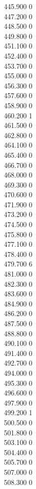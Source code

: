 { 445.900	0 \\
 447.200	0 \\
 448.500	0 \\
 449.800	0 \\
 451.100	0 \\
 452.400	0 \\
 453.700	0 \\
 455.000	0 \\
 456.300	0 \\
 457.600	0 \\
 458.900	0 \\
 460.200	1 \\
 461.500	0 \\
 462.800	0 \\
 464.100	0 \\
 465.400	0 \\
 466.700	0 \\
 468.000	0 \\
 469.300	0 \\
 470.600	0 \\
 471.900	0 \\
 473.200	0 \\
 474.500	0 \\
 475.800	0 \\
 477.100	0 \\
 478.400	0 \\
 479.700	6 \\
 481.000	0 \\
 482.300	0 \\
 483.600	0 \\
 484.900	0 \\
 486.200	0 \\
 487.500	0 \\
 488.800	0 \\
 490.100	0 \\
 491.400	0 \\
 492.700	0 \\
 494.000	0 \\
 495.300	0 \\
 496.600	0 \\
 497.900	0 \\
 499.200	1 \\
 500.500	0 \\
 501.800	0 \\
 503.100	0 \\
 504.400	0 \\
 505.700	0 \\
 507.000	0 \\
 508.300	0 \\
}
